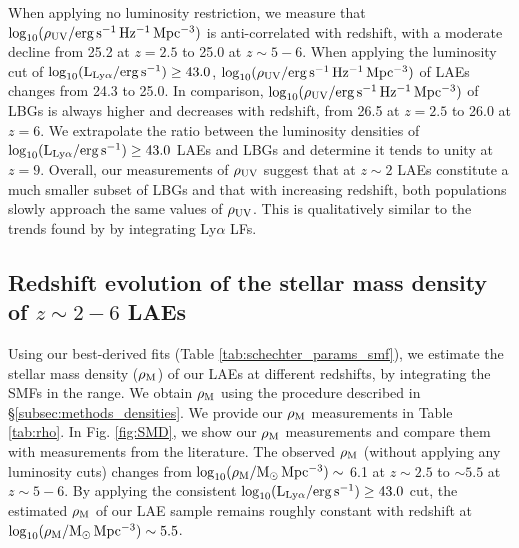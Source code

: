 \documentclass[a4paper,fleqn,usenatbib]{mnras}
\begin{document}
When applying no luminosity restriction, we measure that $\log_{10}(\rm\rho_{UV}/erg\,s^{-1}\,Hz^{-1}\,Mpc^{-3})$ is anti-correlated with redshift, with a moderate decline from 25.2 at $z=2.5$ to 25.0 at $z\sim5-6$. When applying the luminosity cut of $\log_{10} (\rm L_{Ly\alpha}/erg\,s^{-1}) \geq 43.0$,  $\log_{10}(\rm\rho_{UV}/erg\,s^{-1}\,Hz^{-1}\,Mpc^{-3})$ of LAEs changes from 24.3 to 25.0. In comparison, $\log_{10}(\rm\rho_{UV}/erg\,s^{-1}\,Hz^{-1}\,Mpc^{-3})$ of LBGs is always higher and decreases with redshift, from 26.5 at $z=2.5$ to 26.0 at $z=6$. We extrapolate the ratio between the luminosity densities of $\log_{10} (\rm L_{Ly\alpha}/erg\,s^{-1}) \geq 43.0$ LAEs and LBGs and determine it tends to unity at $z=9$. Overall, our measurements of $\rho_{\rm UV}$ suggest that at $z\sim2$ LAEs constitute a much smaller subset of LBGs and that with increasing redshift, both populations slowly approach the same values of 
$\rho_{\rm UV}$. This is qualitatively similar to the trends found by \cite{Sobral2018} by integrating Ly$\alpha$ LFs.

\subsection{Redshift evolution of the stellar mass density of $z\sim2-6$ LAEs}  \label{sec:smd_evo}

Using our best-derived fits (Table \ref{tab:schechter_params_smf}), we estimate the stellar mass density ($\rho_{\rm M}$) of our LAEs at different redshifts, by integrating the SMFs in the range. We obtain $\rho_{\rm M}$ using the procedure described in \S\ref{subsec:methods_densities}.  We provide our $\rho_{\rm M}$ measurements in Table \ref{tab:rho}. In Fig. \ref{fig:SMD}, we show our $\rho_{\rm M}$ measurements and compare them with measurements from the literature. The observed $\rho_{\rm M}$ (without applying any luminosity cuts) changes from $\log_{10}(\rm\rho_{M}/M_\odot\,Mpc^{-3})\sim$ 6.1 at $z\sim2.5$ to $\sim5.5$ at $z\sim5-6$. By applying the consistent $\log_{10} (\rm L_{Ly\alpha}/erg\,s^{-1}) \geq 43.0$ cut, the estimated $\rho_{\rm M}$ of our LAE sample remains roughly constant with redshift at $\log_{10}(\rm\rho_{M}/M_\odot\,Mpc^{-3})\sim5.5$. 
\end{document}
